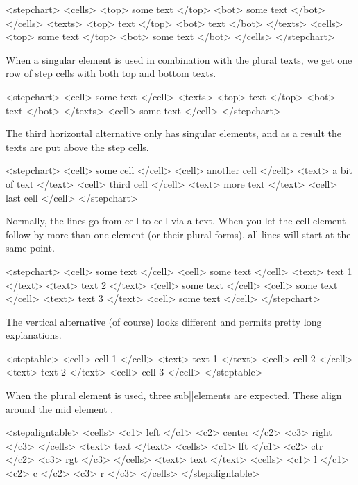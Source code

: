 \startbuffer
<stepchart>
  <cells> <top> some text </top> <bot> some text </bot> </cells>
  <texts> <top> text </top> <bot> text </bot> </texts>
  <cells> <top> some text </top> <bot> some text </bot> </cells>
</stepchart>
\stopbuffer

\typebuffer \processxmlbuffer

When a singular  element is used in combination with the plural \type
{texts}, we get one row of step cells with both top and bottom texts.

\startbuffer
<stepchart>
  <cell> some text </cell>
  <texts> <top> text </top> <bot> text </bot> </texts>
  <cell> some text </cell>
</stepchart>
\stopbuffer

\typebuffer \processxmlbuffer

The third horizontal alternative only has singular elements, and as a result the
texts are put above the step cells.

\startbuffer
<stepchart>
  <cell> some cell </cell>
  <cell> another cell </cell> <text> a bit of text </text>
  <cell> third cell </cell> <text> more text </text>
  <cell> last cell </cell>
</stepchart>
\stopbuffer

\typebuffer \processxmlbuffer

Normally, the lines go from cell to cell via a text. When you let the \type
{cell} element follow by more than one  element (or their plural
forms), all lines will start at the same point.

\startbuffer
<stepchart>
  <cell> some text </cell>
  <cell> some text </cell> <text> text 1 </text> <text> text 2 </text>
  <cell> some text </cell>
  <cell> some text </cell> <text> text 3 </text>
  <cell> some text </cell>
</stepchart>
\stopbuffer

\typebuffer \processxmlbuffer

The vertical alternative (of course) looks different and permits pretty long
explanations.

\startbuffer
<steptable>
  <cell> cell 1 </cell>
  <text> text 1 </text>
  <cell> cell 2 </cell>
  <text> text 2 </text>
  <cell> cell 3 </cell>
</steptable>
\stopbuffer

\typebuffer \processxmlbuffer

When the plural element  is used, three sub||elements are expected.
These align around the mid element .

\startbuffer
<stepaligntable>
  <cells> <c1> left </c1> <c2> center </c2> <c3> right </c3> </cells>
  <text> text </text>
  <cells> <c1> lft </c1> <c2> ctr </c2> <c3> rgt </c3> </cells>
  <text> text </text>
  <cells> <c1> l </c1> <c2> c </c2> <c3> r </c3> </cells>
</stepaligntable>
\stopbuffer

